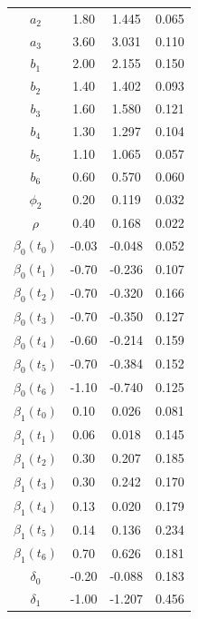 \documentclass[12pt]{article}
\begin{document}
\begin{center}
\begin{longtable}{|c |c |c |c|}
\hline \hline
\endlastfoot
$a_2$ &1.80 & 1.445 & 0.065 \\
$a_3$ &3.60 & 3.031  & 0.110  \\
$b_1$ &2.00 & 2.155  & 0.150 \\  
$b_2$ &1.40 & 1.402  & 0.093 \\
$b_3$ &1.60 & 1.580  & 0.121 \\
$b_4$ &1.30 & 1.297  & 0.104 \\
$b_5$ &1.10 & 1.065  & 0.057 \\
$b_6$ &0.60 & 0.570  & 0.060\\
$\phi_2$ & 0.20 & 0.119 & 0.032 \\
$\rho$ & 0.40 & 0.168   & 0.022\\
$\beta_0(t_0)$ &-0.03 & -0.048 & 0.052 \\
$\beta_0(t_1)$ &-0.70 & -0.236 & 0.107\\
$\beta_0(t_2)$ &-0.70& -0.320 & 0.166\\
$\beta_0(t_3)$ &-0.70& -0.350 & 0.127\\
$\beta_0(t_4)$ &-0.60& -0.214 & 0.159\\
$\beta_0(t_5)$ &-0.70& -0.384 & 0.152\\
$\beta_0(t_6)$ &-1.10& -0.740 & 0.125\\
$\beta_1(t_0)$ &0.10& 0.026 & 0.081 \\
$\beta_1(t_1)$ &0.06& 0.018 & 0.145 \\
$\beta_1(t_2)$ &0.30& 0.207 & 0.185 \\
$\beta_1(t_3)$ &0.30& 0.242 & 0.170 \\
$\beta_1(t_4)$ &0.13& 0.020 & 0.179 \\
$\beta_1(t_5)$ &0.14& 0.136 & 0.234 \\
$\beta_1(t_6)$ &0.70& 0.626 & 0.181 \\
$\delta_0$  & -0.20 & -0.088  & 0.183  \\
$\delta_1$  &-1.00 & -1.207  & 0.456\\
\hline
\end{longtable}
\end{center}




\newpage
%
%

 
\end{document}
